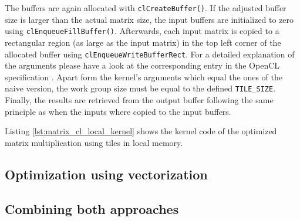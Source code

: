 The buffers are again allocated with \lstinline!clCreateBuffer()!. If the adjusted buffer size is larger than the actual matrix size, the input buffers are initialized to zero using \lstinline!clEnqueueFillBuffer()!. Afterwards, each input matrix is copied to a rectangular region (as large as the input matrix) in the top left corner of the allocated buffer using \lstinline!clEnqueueWriteBufferRect!. For a detailed explanation of the arguments please have a look at the corresponding entry in the OpenCL specification \cite[p.76]{opencl_spec}. Apart form the kernel's arguments which equal the ones of the naive version, the work group size must be equal to the defined \lstinline!TILE_SIZE!. Finally, the results are retrieved from the output buffer following the same principle as when the inputs where copied to the input buffers.

Listing \ref{lst:matrix_cl_local_kernel} shows the kernel code of the optimized matrix multiplication using tiles in local memory.






\subsection{Optimization using vectorization}





\subsection{Combining both approaches}



